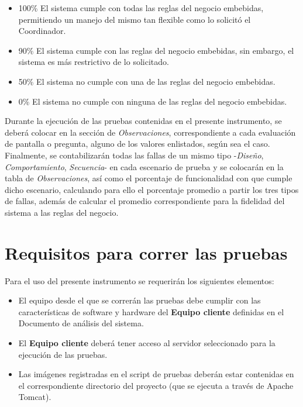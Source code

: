 \documentclass[oneside,10pt]{book}
\begin{document}
\begin{itemize}	
\item 100\% El sistema cumple con todas las reglas del negocio embebidas, permitiendo un manejo del mismo tan flexible como lo solicitó el Coordinador.
\item 90\% El sistema cumple con las reglas del negocio embebidas, sin embargo, el sistema es más restrictivo de lo solicitado.
\item 50\% El sistema no cumple con una de las reglas del negocio embebidas.
\item 0\% El sistema no cumple con ninguna de las reglas del negocio embebidas.
\end{itemize}

	Durante la ejecución de las pruebas contenidas en el presente instrumento, se deberá colocar en la sección de \textit{Observaciones}, correspondiente a cada evaluación de pantalla o pregunta, alguno de los valores enlistados, según sea el caso. Finalmente, se contabilizarán todas las fallas de un mismo tipo -\textit{Diseño}, \textit{Comportamiento}, \textit{Secuencia}- en cada escenario de prueba y se colocarán en la tabla de \textit{Observaciones}, así como el porcentaje de funcionalidad con que cumple dicho escenario, calculando para ello el porcentaje promedio a partir los tres tipos de fallas, además de calcular el promedio correspondiente para la fidelidad del sistema a las reglas del negocio.
\section{Requisitos para correr las pruebas}

Para el uso del presente instrumento se requerirán los siguientes elementos:

\begin{itemize}
	\item El equipo desde el que se correrán las pruebas debe cumplir con las características de software y hardware del \textbf{Equipo cliente} definidas en el Documento de análisis del sistema.
	\item El \textbf{Equipo cliente} deberá tener acceso al servidor seleccionado para la ejecución de las pruebas.
	\item Las imágenes registradas en el script de pruebas deberán estar contenidas en el correspondiente directorio del proyecto (que se ejecuta a través de Apache Tomcat).
\end{itemize}
\end{document}
